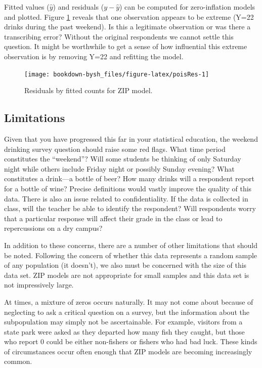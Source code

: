 \documentclass[
]{krantz}
\begin{document}
Fitted values (\(\hat{y}\)) and residuals (\(y-\hat{y}\)) can be computed for zero-inflation models and plotted. Figure \ref{fig:poisRes} reveals that one observation appears to be extreme (Y=22 drinks during the past weekend). Is this a legitimate observation or was there a transcribing error? Without the original respondents we cannot settle this question. It might be worthwhile to get a sense of how influential this extreme observation is by removing Y=22 and refitting the model.

\begin{figure}

{\centering \texttt{[image: bookdown-bysh\_files/figure-latex/poisRes-1]} 

}

\caption{Residuals by fitted counts for ZIP model.}\label{fig:poisRes}
\end{figure}

\hypertarget{limitations}{%
\subsection{Limitations}\label{limitations}}

Given that you have progressed this far in your statistical education, the weekend drinking survey question should raise some red flags. What time period constitutes the ``weekend''? Will some students be thinking of only Saturday night while others include Friday night or possibly Sunday evening? What constitutes a drink---a bottle of beer? How many drinks will a respondent report for a bottle of wine? Precise definitions would vastly improve the quality of this data. There is also an issue related to confidentiality. If the data is collected in class, will the teacher be able to identify the respondent? Will respondents worry that a particular response will affect their grade in the class or lead to repercussions on a dry campus?

In addition to these concerns, there are a number of other limitations that should be noted. Following the concern of whether this data represents a random sample of any population (it doesn't), we also must be concerned with the size of this data set. ZIP models are not appropriate for small samples and this data set is not impressively large.

At times, a mixture of zeros occurs naturally. It may not come about because of neglecting to ask a critical question on a survey, but the information about the subpopulation may simply not be ascertainable. For example, visitors from a state park were asked as they departed how many fish they caught, but those who report 0 could be either non-fishers or fishers who had bad luck. These kinds of circumstances occur often enough that ZIP models are becoming increasingly common.
\end{document}
